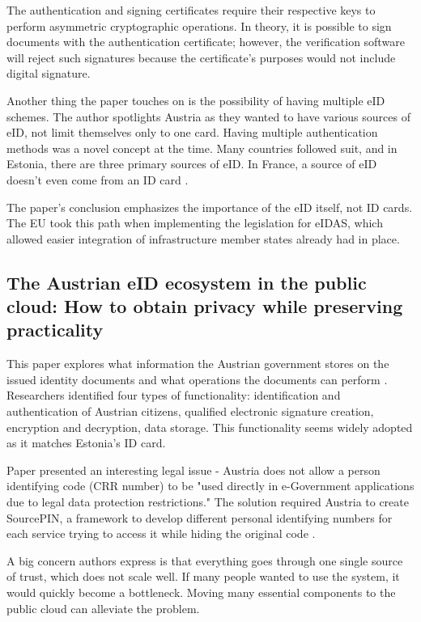 The authentication and signing certificates require their respective keys to perform asymmetric cryptographic operations. In theory, it is possible to sign documents with the authentication certificate; however, the verification software will reject such signatures because the certificate's purposes would not include digital signature.

Another thing the paper touches on is the possibility of having multiple eID schemes. The author spotlights Austria as they wanted to have various sources of eID, not limit themselves only to one card. Having multiple authentication methods was a novel concept at the time. Many countries followed suit, and in Estonia, there are three primary sources of eID. In France, a source of eID doesn't even come from an ID card \cite{eidas-notify-france}.

The paper's conclusion emphasizes the importance of the eID itself, not ID cards. The EU took this path when implementing the legislation for eIDAS, which allowed easier integration of infrastructure member states already had in place.

\subsection{The Austrian eID ecosystem in the public cloud: How to obtain privacy while preserving practicality}

This paper explores what information the Austrian government stores on the issued identity documents and what operations the documents can perform \cite{ZWATTENDORFER201635}. Researchers identified four types of functionality: identification and authentication of Austrian citizens, qualified electronic signature creation, encryption and decryption, data storage. This functionality seems widely adopted as it matches Estonia's ID card.

Paper presented an interesting legal issue - Austria does not allow a person identifying code (CRR number) to be "used directly in e-Government applications due to legal data protection restrictions." The solution required Austria to create SourcePIN, a framework to develop different personal identifying numbers for each service trying to access it while hiding the original code \cite{ZWATTENDORFER201635,austria-eid-presentation}.

A big concern authors express is that everything goes through one single source of trust, which does not scale well. If many people wanted to use the system, it would quickly become a bottleneck. Moving many essential components to the public cloud can alleviate the problem.

